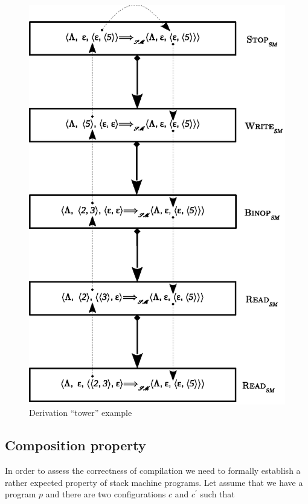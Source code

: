 \begin{figure}[h]
  \centering
  \includegraphics[scale=0.8]{images/05-01.eps}
  \caption{Derivation ``tower'' example}
  \label{derivation-tower}
\end{figure}

\subsection{Composition property}

In order to assess the correctness of compilation we need to formally establish a rather expected property of stack machine programs. Let assume
that we have a program $p$ and there are two configurations $c$ and $c^\prime$ such that

